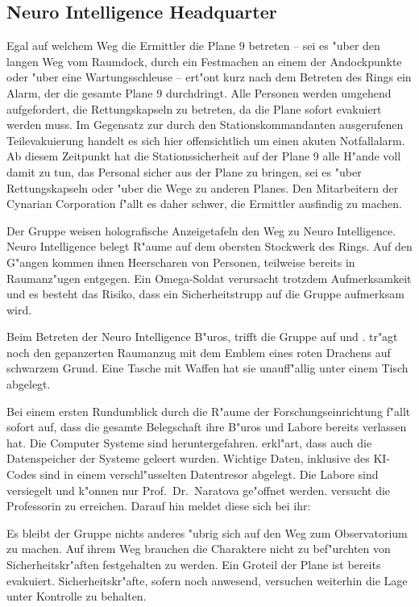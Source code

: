 \subsection{Neuro Intelligence Headquarter}
Egal auf welchem Weg die Ermittler die Plane 9 betreten -- sei es "uber den langen Weg vom Raumdock, durch ein Festmachen an einem der Andockpunkte oder "uber eine Wartungsschleuse -- ert"ont kurz nach dem Betreten des Rings ein Alarm, der die gesamte Plane 9 durchdringt. Alle Personen werden umgehend aufgefordert, die Rettungskapseln zu betreten, da die Plane sofort evakuiert werden muss. Im Gegensatz zur durch den Stationskommandanten ausgerufenen Teilevakuierung handelt es sich hier offensichtlich um einen akuten Notfallalarm. Ab diesem Zeitpunkt hat die Stationssicherheit auf der Plane 9 alle H"ande voll damit zu tun, das Personal sicher aus der Plane zu bringen, sei es "uber Rettungskapseln oder "uber die Wege zu anderen Planes. Den Mitarbeitern der Cynarian Corporation f"allt es daher schwer, die Ermittler ausfindig zu machen.

Der Gruppe weisen holografische Anzeigetafeln den Weg zu Neuro Intelligence. Neuro Intelligence belegt R"aume auf dem obersten Stockwerk des Rings. Auf den G"angen kommen ihnen Heerscharen von Personen, teilweise bereits in Raumanz"ugen entgegen. Ein Omega-Soldat verursacht trotzdem Aufmerksamkeit und es besteht das Risiko, dass ein Sicherheitstrupp auf die Gruppe aufmerksam wird.

Beim Betreten der Neuro Intelligence B"uros, trifft die Gruppe auf \xl{} und \ml{}. \xl{} tr"agt noch den gepanzerten Raumanzug mit dem Emblem eines roten Drachens auf schwarzem Grund. Eine Tasche mit Waffen hat sie unauff"allig unter einem Tisch abgelegt. 

Bei einem ersten Rundumblick durch die R"aume der Forschungseinrichtung f"allt sofort auf, dass die gesamte Belegschaft ihre B"uros und Labore bereits verlassen hat. Die Computer Systeme sind heruntergefahren. \ml{} erkl"art, dass auch die Datenspeicher der Systeme geleert wurden. Wichtige Daten, inklusive des KI-Codes sind in einem verschl"usselten Datentresor abgelegt. Die Labore sind versiegelt und k"onnen nur Prof.~Dr.~Naratova ge"offnet werden. \ml{} versucht die Professorin zu erreichen. Darauf hin meldet diese sich bei ihr:


Es bleibt der Gruppe nichts anderes "ubrig sich auf den Weg zum Observatorium zu machen. Auf ihrem Weg brauchen die Charaktere nicht zu bef"urchten von Sicherheitskr"aften festgehalten zu werden. Ein Gro\3teil der Plane ist bereits evakuiert. Sicherheitskr"afte, sofern noch anwesend, versuchen weiterhin die Lage unter Kontrolle zu behalten.

